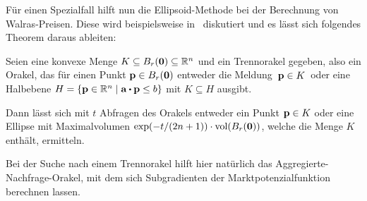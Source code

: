 Für einen Spezialfall hilft nun die Ellipsoid-Methode bei der Berechnung von Walras-Preisen.
Diese wird beispielsweise in~\cite[Abschnitt~2]{ellipsoid} diskutiert und es lässt sich folgendes Theorem daraus ableiten:

\begin{theorem}
Seien eine konvexe Menge $K\subseteq B_r(\mathbf{0})\subseteq \mathbb{R}^n$ und ein Trennorakel gegeben, also ein Orakel, das für einen Punkt $\mathbf{p}\in B_r(\mathbf{0})$  entweder die Meldung \glqq\,$\mathbf{p}\in K$\grqq\ oder eine Halbebene $H=\{ \fp \in\R^n \mid \fa \bcdot \fp \leq b \}$ mit $K\subseteq H$ ausgibt.

Dann lässt sich mit $t$ Abfragen des Orakels entweder ein Punkt $\mathbf{p}\in K$ oder eine Ellipse mit Maximalvolumen $\exp({-t / ({2n + 1}})) \cdot \operatorname{vol}(B_r(\mathbf{0}))$, welche die Menge $K$ enthält, ermitteln.
\end{theorem}

Bei der Suche nach einem Trennorakel hilft hier natürlich das Aggregierte-Nachfrage-Orakel, mit dem sich Subgradienten der Marktpotenzialfunktion berechnen lassen.

